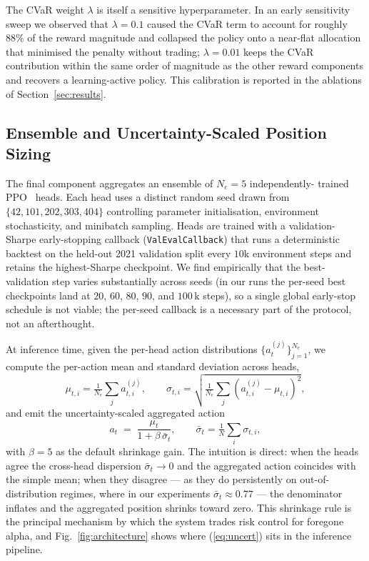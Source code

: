 \documentclass[conference]{IEEEtran}
\begin{document}
The CVaR weight $\lambda$ is itself a sensitive hyperparameter. In an
early sensitivity sweep we observed that $\lambda = 0.1$ caused the
CVaR term to account for roughly $88\%$ of the reward magnitude and
collapsed the policy onto a near-flat allocation that minimised the
penalty without trading; $\lambda = 0.01$ keeps the CVaR contribution
within the same order of magnitude as the other reward components and
recovers a learning-active policy. This calibration is reported in the
ablations of Section~\ref{sec:results}.

\subsection{Ensemble and Uncertainty-Scaled Position Sizing}
\label{sec:method:ensemble}

The final component aggregates an ensemble of $N_e = 5$ independently-
trained PPO~\cite{schulman2017ppo} heads. Each head uses a distinct
random seed drawn from $\{42, 101, 202, 303, 404\}$ controlling
parameter initialisation, environment stochasticity, and minibatch
sampling. Heads are trained with a validation-Sharpe early-stopping
callback (\texttt{ValEvalCallback}) that runs a deterministic backtest
on the held-out 2021 validation split every $10\text{k}$ environment
steps and retains the highest-Sharpe checkpoint. We find empirically
that the best-validation step varies substantially across seeds (in our
runs the per-seed best checkpoints land at $20$, $60$, $80$, $90$, and
$100\,\text{k}$ steps), so a single global early-stop schedule is not
viable; the per-seed callback is a necessary part of the protocol, not
an afterthought.

At inference time, given the per-head action distributions
$\{a^{(j)}_t\}_{j=1}^{N_e}$, we compute the per-action mean and
standard deviation across heads,
\begin{equation}
  \mu_{t,i} = \tfrac{1}{N_e}\sum_j a^{(j)}_{t,i}, \qquad
  \sigma_{t,i} = \sqrt{\tfrac{1}{N_e}\sum_j (a^{(j)}_{t,i}-\mu_{t,i})^{2}},
\end{equation}
and emit the uncertainty-scaled aggregated action
\begin{equation}
  a_t \;=\; \frac{\mu_t}{1 + \beta\,\bar{\sigma}_t},
  \qquad \bar{\sigma}_t = \tfrac{1}{N}\sum_i \sigma_{t,i},
  \label{eq:uncert}
\end{equation}
with $\beta = 5$ as the default shrinkage gain. The intuition is direct:
when the heads agree the cross-head dispersion $\bar{\sigma}_t \to 0$
and the aggregated action coincides with the simple mean; when they
disagree --- as they do persistently on out-of-distribution regimes,
where in our experiments $\bar{\sigma}_t \approx 0.77$ --- the
denominator inflates and the aggregated position shrinks toward zero.
This shrinkage rule is the principal mechanism by which the system
trades risk control for foregone alpha, and Fig.~\ref{fig:architecture}
shows where (\ref{eq:uncert}) sits in the inference pipeline.
\end{document}
